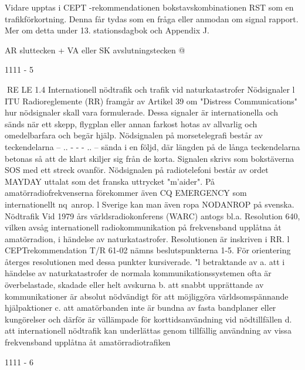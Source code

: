 Vidare upptas i CEPT -rekommendationen bokstavskombinationen RST som en
trafikförkortning. Denna får tydas som en
fråga eller anmodan om signal rapport.
Mer om detta under 13. stationsdagbok
och Appendix J.

AR
sluttecken
+
VA eller SK avslutningstecken @

1111 - 5

RE LE
1.4 Internationell nödtrafik och trafik vid naturkatastrofer
Nödsignaler
l ITU Radioreglemente (RR) framgår av Artikel 39 om "Distress Communications" hur
nödsignaler skall vara formulerade. Dessa
signaler är internationella och sänds när ett
skepp, flygplan eller annan farkost hotas av
allvarlig och omedelbarfara och begär hjälp.
Nödsignalen på morsetelegrafi består av
teckendelarna -- .. - - - .. -- sända i en följd,
där längden på de långa teckendelarna betonas så att de klart skiljer sig från de korta.
Signalen skrivs som bokstäverna SOS med
ett streck ovanför.
Nödsignalen på radiotelefoni består av
ordet MAYDAY uttalat som det franska uttrycket "m'aider".
På amatörradiofrekvenserna förekommer
även CQ EMERGENCY som internationellt
nq~anrop. l Sverige kan man även ropa
NODANROP på svenska.
Nödtrafik
Vid 1979 års världsradiokonferens (WARC)
antogs bl.a. Resolution 640, vilken avsåg
internationell radiokommunikation på frekvensband upplåtna åt amatörradion, i händelse av naturkatastrofer.
Resolutionen är inskriven i RR. l CEPTrekommendation T/R 61-02 nämns beslutspunkterna 1-5. För orientering återges resolutionen med dessa punkter kursiverade.
"l betraktande av
a. att i händelse av naturkatastrofer de normala kommunikationssystemen ofta är
överbelastade, skadade eller helt avskurna
b. att snabbt upprättande av kommunikationer är absolut nödvändigt för att möjliggöra världsomspännande hjälpaktioner
c. att amatörbanden inte är bundna av fasta
bandplaner eller kungörelser och därför
är vällämpade för korttidsanvändning vid
nödtillfällen
d. att internationell nödtrafik kan underlättas genom tillfällig användning av vissa
frekvensband upplåtna åt amatörradiotrafiken

1111 - 6

